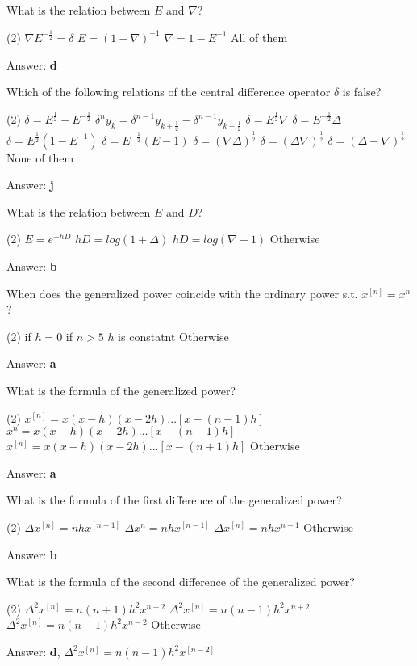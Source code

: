 \documentclass{exam}
\begin{document}
\begin{questions}
	\question What is the relation between $E$ and $\nabla$?
	\begin{tasks}(2)
		\task $\nabla E^{-\frac{1}{2}} = \delta$
		\task $E = (1 - \nabla)^{-1}$
		\task $\nabla = 1 - E^{-1}$
		\task All of them
	\end{tasks}
	Answer: \textbf{d}

	\question Which of the following relations of the central difference operator $\delta$ is false?
	\begin{tasks}(2)
		\task $\delta = E^{\frac{1}{2}} - E^{-\frac{1}{2}}$
		\task $\delta^n y_k = \delta^{n-1} y_{k+\frac{1}{2}} - \delta^{n-1} y_{k-\frac{1}{2}}$
		\task $\delta = E^{\frac{1}{2}} \nabla$
		\task $\delta = E^{-\frac{1}{2}} \Delta$
		\task $\delta = E^{\frac{1}{2}} (1 - E^{-1})$
		\task $\delta = E^{-\frac{1}{2}} (E - 1)$
		\task $\delta = (\nabla \Delta)^{\frac{1}{2}}$
		\task $\delta = (\Delta \nabla)^{\frac{1}{2}}$
		\task $\delta = (\Delta - \nabla)^{\frac{1}{2}}$
		\task None of them
	\end{tasks}
	Answer: \textbf{j}

	\question What is the relation between $E$ and $D$?
	\begin{tasks}(2)
		\task $E = e^{-hD}$
		\task $hD = log(1+\Delta)$
		\task $hD = log(\nabla-1)$
		\task Otherwise
	\end{tasks}
	Answer: \textbf{b}

	\question When does the generalized power coincide with the ordinary power s.t. $x^{[n]}=x^n$?
	\begin{tasks}(2)
		\task if $h = 0$
		\task if $n > 5$
		\task $h$ is constatnt
		\task Otherwise
	\end{tasks}
	Answer: \textbf{a}

	\question What is the formula of the generalized power?
	\begin{tasks}(2)
		\task $x^{[n]} = x(x-h)(x-2h)...[x-(n-1)h]$
		\task $x^{n} = x(x-h)(x-2h)...[x-(n-1)h]$
		\task $x^{[n]} = x(x-h)(x-2h)...[x-(n+1)h]$
		\task Otherwise
	\end{tasks}
	Answer: \textbf{a}

	\question What is the formula of the first difference of the generalized power?
	\begin{tasks}(2)
		\task $\Delta x^{[n]} = nhx^{[n+1]}$
		\task $\Delta x^{n} = nhx^{[n-1]}$
		\task $\Delta x^{[n]} = nhx^{n-1}$
		\task Otherwise
	\end{tasks}
	Answer: \textbf{b}

	\question What is the formula of the second difference of the generalized power?
	\begin{tasks}(2)
		\task $\Delta^2 x^{[n]} = n(n+1) h^2 x^{n-2}$
		\task $\Delta^2 x^{[n]} = n(n-1) h^2 x^{n+2}$
		\task $\Delta^2 x^{[n]} = n(n-1) h^2 x^{n-2}$
		\task Otherwise
	\end{tasks}
	Answer: \textbf{d}, $\Delta^2 x^{[n]} = n(n-1) h^2 x^{[n-2]}$


\end{questions}
\end{document}
